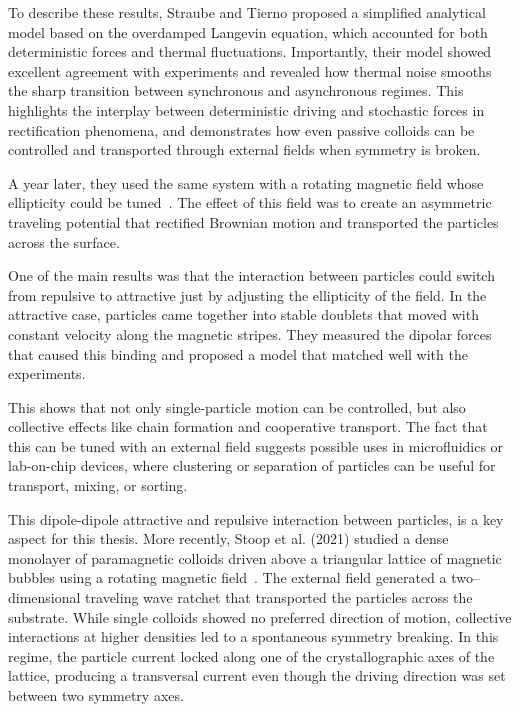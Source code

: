 To describe these results, Straube and Tierno proposed a simplified analytical model based on the overdamped Langevin equation, which accounted for both deterministic forces and thermal fluctuations. Importantly, their model showed excellent agreement with experiments and revealed how thermal noise smooths the sharp transition between synchronous and asynchronous regimes. This highlights the interplay between deterministic driving and stochastic forces in rectification phenomena, and demonstrates how even passive colloids can be controlled and transported through external fields when symmetry is broken.

A year later, they used the same system with a rotating magnetic field whose ellipticity could be tuned~\cite{straube2014tunable}. The effect of this field was to create an asymmetric traveling potential that rectified Brownian motion and transported the particles across the surface.

One of the main results was that the interaction between particles could switch from repulsive to attractive just by adjusting the ellipticity of the field. In the attractive case, particles came together into stable doublets that moved with constant velocity along the magnetic stripes. They measured the dipolar forces that caused this binding and proposed a model that matched well with the experiments.

This shows that not only single-particle motion can be controlled, but also collective effects like chain formation and cooperative transport. The fact that this can be tuned with an external field suggests possible uses in microfluidics or lab-on-chip devices, where clustering or separation of particles can be useful for transport, mixing, or sorting.

This dipole-dipole attractive and repulsive interaction between particles, is a key aspect for this thesis. More recently, Stoop et al. (2021) studied a dense monolayer of paramagnetic colloids driven above a triangular lattice of magnetic bubbles using a rotating magnetic field~\cite{stoop2020collective}. The external field generated a two–dimensional traveling wave ratchet that transported the particles across the substrate. While single colloids showed no preferred direction of motion, collective interactions at higher densities led to a spontaneous symmetry breaking. In this regime, the particle current locked along one of the crystallographic axes of the lattice, producing a transversal current even though the driving direction was set between two symmetry axes.


